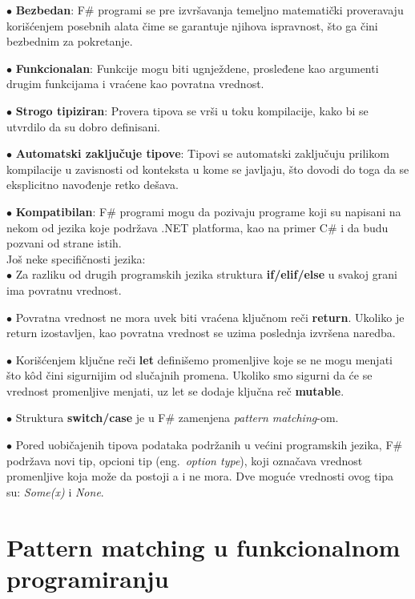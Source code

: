 \documentclass[a4paper]{article}
\begin{document}
	$\bullet$ \textbf{Bezbedan}: F\# programi se pre izvršavanja temeljno matematički proveravaju korišćenjem posebnih alata čime se garantuje njihova ispravnost, što ga čini bezbednim za pokretanje.

	$\bullet$ \textbf{Funkcionalan}: Funkcije mogu biti ugnježdene, prosleđene kao argumenti drugim funkcijama i vraćene kao povratna vrednost.

	$\bullet$ \textbf{Strogo tipiziran}: Provera tipova se vrši u toku kompilacije, kako bi se utvrdilo da su dobro definisani. 

	$\bullet$ \textbf{Automatski zaključuje tipove}: Tipovi se automatski zaključuju prilikom kompilacije u zavisnosti od konteksta u kome se javljaju, što dovodi do toga da se eksplicitno navođenje retko dešava.

	$\bullet$ \textbf{Kompatibilan}: F\# programi mogu da pozivaju programe koji su napisani na nekom od jezika koje podržava .NET platforma, kao na primer C\# i da budu pozvani od strane istih. 
\\
 
	Još neke specifičnosti jezika: \\
	
	$\bullet$ Za razliku od drugih programskih jezika struktura \textbf{if/elif/else} u svakoj grani ima povratnu vrednost.
	 
	$\bullet$ Povratna vrednost ne mora uvek biti vraćena ključnom reči \textbf{return}. Ukoliko je return izostavljen, kao povratna vrednost se uzima poslednja izvršena naredba.
	 
	$\bullet$ Korišćenjem ključne reči \textbf{let} definišemo promenljive koje se ne mogu menjati što kôd čini sigurnijim od slučajnih promena. Ukoliko smo sigurni da će se vrednost promenljive menjati, uz let se dodaje ključna reč \textbf{mutable}.
	 
	$\bullet$ Struktura \textbf{switch/case} je u F\# zamenjena {\em pattern matching}-om\cite{expertFS}.
	 
$\bullet$ Pored uobičajenih tipova podataka podržanih u većini programskih jezika, F\# podržava novi tip, opcioni tip (eng.~{\em option type}), koji označava vrednost promenljive koja može da postoji a i ne mora. Dve moguće vrednosti ovog tipa su: {\em Some(x)} i {\em None}.

\section{Pattern matching u funkcionalnom programiranju}
\end{document}
